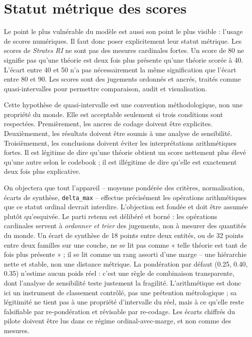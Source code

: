 \documentclass[11pt,a4paper]{article}
\begin{document}
\section{Statut métrique des scores}

Le point le plus vulnérable du modèle est aussi son point le plus visible : l'usage de scores numériques. Il faut donc poser explicitement leur statut métrique. Les scores de \emph{Strates RI} ne sont pas des mesures cardinales fortes. Un score de 80 ne signifie pas qu'une théorie est deux fois plus présente qu'une théorie scorée à 40. L'écart entre 40 et 50 n'a pas nécessairement la même signification que l'écart entre 80 et 90. Les scores sont des jugements ordonnés et ancrés, traités comme quasi-intervalles pour permettre comparaison, audit et visualisation.

Cette hypothèse de quasi-intervalle est une convention méthodologique, non une propriété du monde. Elle est acceptable seulement si trois conditions sont respectées. Premièrement, les ancres de codage doivent être explicites. Deuxièmement, les résultats doivent être soumis à une analyse de sensibilité. Troisièmement, les conclusions doivent éviter les interprétations arithmétiques fortes. Il est légitime de dire qu'une théorie obtient un score nettement plus élevé qu'une autre selon le codebook ; il est illégitime de dire qu'elle est exactement deux fois plus explicative.

On objectera que tout l'appareil -- moyenne pondérée des critères, normalisation, écarts de synthèse, \texttt{delta\_max} -- effectue précisément les opérations arithmétiques que ce statut ordinal devrait interdire. L'objection est fondée et doit être assumée plutôt qu'esquivée. Le parti retenu est délibéré et borné : les opérations cardinales servent à \emph{ordonner et trier} des jugements, non à mesurer des quantités du monde. Un écart de synthèse de 18 points entre deux entités, ou de 32 points entre deux familles sur une couche, ne se lit pas comme « telle théorie est tant de fois plus présente » ; il se lit comme un rang assorti d'une marge -- une hiérarchie nette et stable, non une distance métrique. La pondération par défaut (0.25, 0.40, 0.35) n'estime aucun poids réel : c'est une règle de combinaison transparente, dont l'analyse de sensibilité teste justement la fragilité. L'arithmétique est donc ici un instrument de classement contrôlé, pas une prétention métrologique ; sa légitimité ne tient pas à une propriété d'intervalle du réel, mais à ce qu'elle reste falsifiable par re-pondération et révisable par re-codage. Les écarts chiffrés du pilote doivent être lus dans ce régime ordinal-avec-marge, et non comme des mesures.
\end{document}
